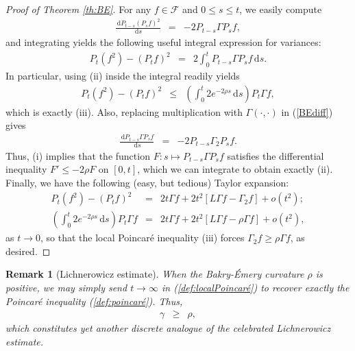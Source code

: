 \documentclass[12pt,final]{article}
\newtheorem{remark}{Remark}[section]
\numberwithin{equation}{section}
\newcommand{\dd}{\,\mathrm{d}}
\newcommand{\cF}{\mathcal {F}}
\begin{document}
\begin{proof}[Proof of Theorem \ref{th:BE}]For any $f\in\cF$ and $0\le s\le t$, we easily compute
\begin{eqnarray}
\label{BEdiff}
\frac{\dd P_{t-s} (P_s f)^2}{\dd s} & = & -2P_{t-s}\Gamma P_s f,
\end{eqnarray} 
and integrating yields the following useful integral expression for variances:
\begin{eqnarray}
\label{variance}
P_t (f^2)-(P_t f)^2 & = & 2\int_0^tP_{t-s}\Gamma P_s f\dd s.
\end{eqnarray}
In particular, using (ii) inside the integral readily yields
\begin{eqnarray}
\label{BEiii}
P_t (f^2)-(P_t f)^2 & \le & \left(\int_0^t 2e^{-2\rho s}\dd s\right)P_t \Gamma f,
\end{eqnarray}
which is exactly (iii). 
Also, replacing multiplication with $\Gamma(\cdot,\cdot)$ in (\ref{BEdiff}) gives 
\begin{eqnarray}
\label{BEdiff2}
\frac{\dd P_{t-s} \Gamma P_s f}{\dd s} & = & -2P_{t-s}\Gamma_2 P_s f.
\end{eqnarray}
Thus,  (i) implies that the function $F\colon s\mapsto P_{t-s} \Gamma P_s f$ satisfies the differential inequality $F'\le -2\rho F$ on $[0,t]$, which we can integrate to obtain  exactly (ii). Finally, we have the following (easy, but tedious) Taylor expansion:
\begin{eqnarray*}
P_t (f^2)-(P_t f)^2 & = & 2t \Gamma f+2t^2\left[L\Gamma f-\Gamma_2f\right] +o(t^2);\\
 \left(\int_0^t 2e^{-2\rho s}\dd s\right)P_t \Gamma f & = & 2t\Gamma f+2t^2\left[L\Gamma f-\rho \Gamma f\right]+o(t^2),
\end{eqnarray*}
as $t\to 0$, so that the local Poincaré inequality (iii) forces $\Gamma_2 f\ge \rho \Gamma f$, as desired. 
\end{proof}
\begin{remark}[Lichnerowicz estimate]\label{rk:Lichnerowicz2}
When the Bakry-\'Emery curvature $\rho$ is positive, we may simply send $t\to\infty$ in (\ref{def:localPoincaré}) to recover exactly the Poincaré inequality (\ref{def:poincaré}). Thus,
\begin{eqnarray*}
\gamma & \ge & \rho,
\end{eqnarray*}
which constitutes yet another discrete analogue of the celebrated Lichnerowicz estimate.
\end{remark}
\end{document}
